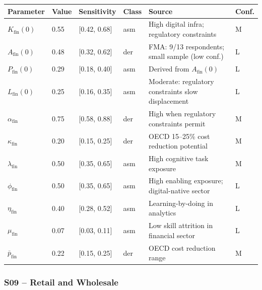 \documentclass[11pt,a4paper]{article}
\begin{document}
\begin{center}
\begin{tabular}{llllll}
\toprule
Parameter & Value & Sensitivity & Class & Source & Conf.\\
\midrule
$K_{\text{fin}}(0)$ & 0.55 & [0.42, 0.68] & asm & High digital infra; regulatory constraints & M \\
$A_{\text{fin}}(0)$ & 0.48 & [0.32, 0.62] & der & FMA: 9/13 respondents; small sample (low conf.) & L \\
$P_{\text{fin}}(0)$ & 0.29 & [0.18, 0.40] & asm & Derived from $A_{\text{fin}}(0)$ & L \\
$L_{\text{fin}}(0)$ & 0.25 & [0.16, 0.35] & asm & Moderate: regulatory constraints slow displacement & L \\
$\alpha_{\text{fin}}$ & 0.75 & [0.58, 0.88] & der & High when regulatory constraints permit & M \\
$\kappa_{\text{fin}}$ & 0.20 & [0.15, 0.25] & der & OECD 15--25\% cost reduction potential & M \\
$\lambda_{\text{fin}}$ & 0.50 & [0.35, 0.65] & asm & High cognitive task exposure & M \\
$\phi_{\text{fin}}$ & 0.50 & [0.35, 0.65] & asm & High enabling exposure; digital-native sector & L \\
$\eta_{\text{fin}}$ & 0.40 & [0.28, 0.52] & asm & Learning-by-doing in analytics & L \\
$\mu_{\text{fin}}$ & 0.07 & [0.03, 0.11] & asm & Low skill attrition in financial sector & L \\
$\bar{p}_{\text{fin}}$ & 0.22 & [0.15, 0.25] & der & OECD cost reduction range & M \\
\bottomrule
\end{tabular}
\end{center}

\subsubsection*{S09 -- Retail and Wholesale}
\end{document}

